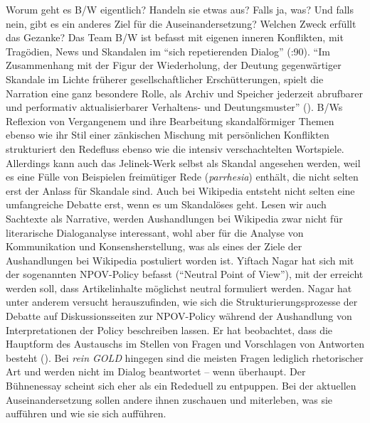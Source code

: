 \documentclass[fontsize=12pt]{scrartcl}
\begin{document}
Worum geht es B/W eigentlich? Handeln sie etwas aus? Falls ja, was? Und falls nein, gibt es ein anderes Ziel f\"ur die Auseinandersetzung? Welchen Zweck erf\"ullt das Gezanke? Das Team B/W ist befasst mit eigenen inneren Konflikten, mit Trag\"odien, News und Skandalen im "`sich repetierenden Dialog"' (\cite{SchmittSchossler2013}:90). "`Im Zusammenhang mit der Figur der Wiederholung, der Deutung gegenw\"artiger Skandale im Lichte fr\"uherer ge\-sell\-schaftlicher Ersch\"utterungen, spielt die Narration eine ganz besondere Rolle, als Archiv und Speicher jederzeit abrufbarer und performativ aktualisierbarer Verhaltens- und Deutungsmuster"' (\cite{Gelzetal2014}). B/Ws Re\-fle\-xion von Vergangenem und ihre Bearbeitung skandalf\"ormiger Themen ebenso wie ihr Stil einer z\"ankischen Mischung mit pers\"onlichen Konflikten strukturiert den Redefluss ebenso wie die intensiv verschachtelten Wortspiele. Al\-ler\-dings kann auch das Jelinek-Werk \mbox{selbst} als Skandal angesehen werden, weil es eine F\"ulle von Beispielen freim\"utiger Rede (\textit{parrhesia}) enth\"alt, die nicht selten erst der Anlass f\"ur Skandale sind. Auch bei Wi\-ki\-pe\-dia entsteht nicht selten eine umfangreiche Debatte erst, wenn es um Skandal\"oses geht. Lesen wir auch Sachtexte als Narrative, werden Aushandlungen bei Wi\-ki\-pe\-dia zwar nicht f\"ur li\-te\-ra\-rische Dialogana\-lyse interessant, wohl aber f\"ur die Ana\-lyse von Kommunikation und Konsensherstellung, was als eines der Ziele der Aushandlungen bei Wi\-ki\-pe\-dia postuliert worden ist. Yiftach Nagar hat sich mit der sogenannten NPOV-Policy befasst ("`Neutral Point of View"'), mit der erreicht werden soll, dass Artikelinhalte m\"oglichst neutral formuliert werden. Nagar hat unter anderem versucht he\-rauszufinden, wie sich die Strukturierungsprozesse der Debatte auf Dis\-kus\-si\-onssei\-ten zur NPOV-Policy w\"ahrend der Aushandlung von Interpretationen der Policy beschrei\-ben lassen. Er hat beobachtet, dass die Hauptform des Austauschs im Stellen von Fragen und Vorschlagen von Antworten be\-steht (\cite{Nagar2012}). Bei \textit{rein GOLD} hingegen sind die meisten Fragen lediglich rhetorischer Art und werden nicht im Dialog beantwortet -- wenn \"uberhaupt. Der B\"uhnenessay scheint sich eher als ein Rededuell zu entpuppen. Bei der aktuellen Auseinandersetzung sollen andere ihnen zuschauen und miterleben, was sie auff\"uhren und wie sie sich auff\"uhren. 
\end{document}
